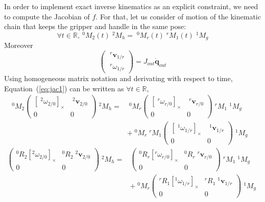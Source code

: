 \documentclass{article}
\newcommand\linvel{\mathbf{v}}
\newcommand\conf{\mathbf{q}}
\newcommand\reals{\mathbb{R}}
\begin{document}
In order to implement exact inverse kinematics as an explicit constraint, we need to compute the Jacobian of $f$. For that, let us consider of motion of the kinematic chain that keeps the gripper and handle in the same pose:
\begin{equation}\label{eq:jac1}
\forall t\in\reals,\ ^0M_2(t)\;^2M_h = \;^0M_r(t) \;^rM_1(t)\;^1M_g
\end{equation}
Moreover
$$
\left(\begin{array}{c}
  \;^r\linvel_{1/r} \\ \;^r\omega_{1/r}
\end{array}\right) =
J_{out} \dot{\conf}_{out}
$$
Using homogeneous matrix notation and derivating with respect to time, Equation~(\ref{eq:jac1}) can be written as $\forall t\in\reals$,
\begin{align}\label{eq:jac2}
  ^0M_2
  \left(\begin{array}{ll}[\;^2\omega_{2/0}]_{\times} & \;^2\linvel_{2/0} \\ 0&0\end{array}\right)\;^2M_h =&
    \;^0M_r\left(\begin{array}{ll}[\;^r\omega_{r/0}]_{\times} & \;^r\linvel_{r/0} \\ 0&0\end{array}\right) \;^rM_1\;^1M_g \\
    & + \;^0M_r \;^rM_1\left(\begin{array}{ll}[\;^1\omega_{1/r}]_{\times} & \;^1\linvel_{1/r} \\ 0&0\end{array}\right)\;^1M_g &
\end{align}
\begin{align*}
  \left(\begin{array}{ll}^0R_2[^2\omega_{2/0}]_{\times} & ^0R_2\;^2\linvel_{2/0} \\ 0&0\end{array}\right)\;^2M_h =&
    \left(\begin{array}{ll}^0R_r[^r\omega_{r/0}]_{\times} & ^0R_r\;^r\linvel_{r/0} \\ 0&0\end{array}\right) \;^rM_1\;^1M_g \\
    & + \;^0M_r \left(\begin{array}{ll}^rR_1[^1\omega_{1/r}]_{\times} & ^rR_1\;^1\linvel_{1/r} \\ 0&0\end{array}\right)\;^1M_g &
\end{align*}
\end{document}
